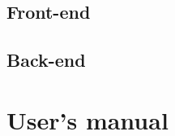 \documentclass[inz, english, shortabstract]{iithesis}
\begin{document}
\section{Front-end}

\section{Back-end}

\chapter{User's manual}\label{ch:manual}

\printbibliography

\end{document}
